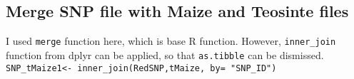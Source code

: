 \documentclass[]{article}
\newenvironment{Shaded}{\begin{snugshade}}{\end{snugshade}}
\newcommand{\KeywordTok}[1]{\textcolor[rgb]{0.13,0.29,0.53}{\textbf{#1}}}
\newcommand{\DataTypeTok}[1]{\textcolor[rgb]{0.13,0.29,0.53}{#1}}
\newcommand{\StringTok}[1]{\textcolor[rgb]{0.31,0.60,0.02}{#1}}
\newcommand{\CommentTok}[1]{\textcolor[rgb]{0.56,0.35,0.01}{\textit{#1}}}
\newcommand{\NormalTok}[1]{#1}
\begin{document}
\subsection{Merge SNP file with Maize and Teosinte
files}\label{merge-snp-file-with-maize-and-teosinte-files}

I used \texttt{merge} function here, which is base R function. However,
\texttt{inner\_join} function from dplyr can be applied, so that
\texttt{as.tibble} can be dismissed.
\texttt{SNP\_tMaize1\textless{}-\ inner\_join(RedSNP,tMaize,\ by=\ "SNP\_ID")}

\begin{Shaded}
\end{Shaded}
\end{document}

